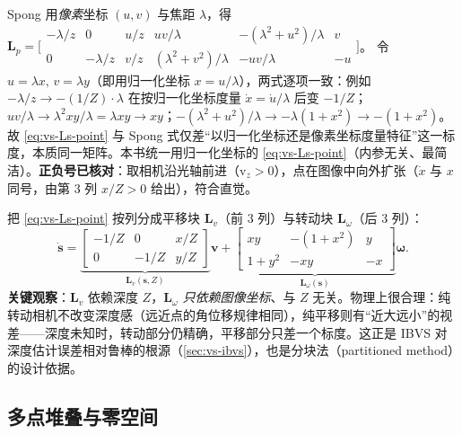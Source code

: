 \begin{note}\label{note:vs-spong-form}
Spong\cite{spong2006robot} 用\emph{像素}坐标 $(u,v)$ 与焦距 $\lambda$，得
$\mathbf{L}_p=\big[\begin{smallmatrix}-\lambda/z&0&u/z&uv/\lambda&-(\lambda^2+u^2)/\lambda&v\\0&-\lambda/z&v/z&(\lambda^2+v^2)/\lambda&-uv/\lambda&-u\end{smallmatrix}\big]$。
令 $u=\lambda x,\,v=\lambda y$（即用归一化坐标 $x=u/\lambda$），两式逐项一致：例如 $-\lambda/z\to-(1/Z)\cdot\lambda$ 在按归一化坐标度量 $\dot{x}=\dot u/\lambda$ 后变 $-1/Z$；$uv/\lambda\to\lambda^2xy/\lambda=\lambda xy\to xy$；$-(\lambda^2+u^2)/\lambda\to-\lambda(1+x^2)\to-(1+x^2)$。故 \cref{eq:vs-Ls-point} 与 Spong 式仅差“以归一化坐标还是像素坐标度量特征”这一标度，本质同一矩阵。本书统一用归一化坐标的 \cref{eq:vs-Ls-point}（内参无关、最简洁）。\textbf{正负号已核对}：取相机沿光轴前进（$\mathrm{v}_z>0$），点在图像中向外扩张（$\dot x$ 与 $x$ 同号，由第 $3$ 列 $x/Z>0$ 给出），符合直觉。
\end{note}

\begin{insight}\label{insight:vs-depth}
把 \cref{eq:vs-Ls-point} 按列分成平移块 $\mathbf{L}_v$（前 $3$ 列）与转动块 $\mathbf{L}_\omega$（后 $3$ 列）：
\[
  \dot{\mathbf{s}}=\underbrace{\begin{bmatrix}-1/Z&0&x/Z\\0&-1/Z&y/Z\end{bmatrix}}_{\mathbf{L}_v(\mathbf{s},Z)}\mathbf{v}
  +\underbrace{\begin{bmatrix}xy&-(1+x^2)&y\\1+y^2&-xy&-x\end{bmatrix}}_{\mathbf{L}_\omega(\mathbf{s})}\boldsymbol{\omega}.
\]
\textbf{关键观察}\cite{spong2006robot,chaumette2006visual}：$\mathbf{L}_v$ 依赖深度 $Z$，$\mathbf{L}_\omega$ \emph{只依赖图像坐标}、与 $Z$ 无关。物理上很合理：纯转动相机不改变深度感（远近点的角位移规律相同），纯平移则有“近大远小”的视差——深度未知时，转动部分仍精确，平移部分只差一个标度。这正是 IBVS 对深度估计误差相对鲁棒的根源（\cref{sec:vs-ibvs}），也是分块法（partitioned method）的设计依据。
\end{insight}

\subsection{多点堆叠与零空间}
\label{sec:vs-interaction-multi}

